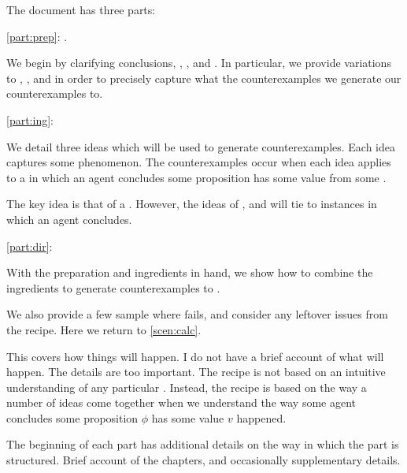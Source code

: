 \begin{note}
  The document has three parts:

  \begin{TOCEnum}
  \item
    \autoref{part:prep}: .

    We begin by clarifying conclusions, \qWhy{}, \qHow{}, and \issueInclusion{}.
    In particular, we provide variations to \qWhy{}, \qHow{}, and \issueInclusion{} in order to precisely capture what the counterexamples we generate our counterexamples to.
  \item
    \autoref{part:ing}: 

    We detail three ideas which will be used to generate counterexamples.
    Each idea captures some phenomenon.
    The counterexamples occur when each idea applies to a  in which an agent concludes some proposition has some value from some \pool{}.

    The key idea is that of a \fc{}.
    However, the ideas of \tC{}, and \requ{} will tie  to instances in which an agent concludes.
  \item
    \autoref{part:dir}: 

    With the preparation and ingredients in hand, we show how to combine the ingredients to generate counterexamples to \issueInclusion{}.

    We also provide a few sample  where \issueInclusion{} fails, and consider any leftover issues from the recipe.
    Here we return to \autoref{scen:calc}.
  \end{TOCEnum}

  This covers how things will happen.
  I do not have a brief account of what will happen.
  The details are too important.
  The recipe is not based on an intuitive understanding of any particular \scen{}.
  Instead, the recipe is based on the way a number of ideas come together when we understand the way some agent concludes some proposition \(\phi\) has some value \(v\) happened.

  The beginning of each part has additional details on the way in which the part is structured.
  Brief account of the chapters, and occasionally supplementary details.
\end{note}



